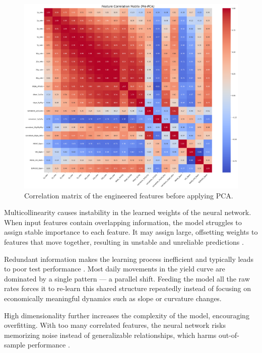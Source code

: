 {\begin{figure}[H]
	\centering
	\includegraphics[width=1\textwidth]{images/features/feature_correlation_matrixPre-PCA.png}
	\caption{Correlation matrix of the engineered features before applying PCA.}
	\label{fig:feature_correlation_prePCA}
\end{figure}

Multicollinearity causes instability in the learned weights of the neural network. When input features contain overlapping information, the model struggles to assign stable importance to each feature. It may assign large, offsetting weights to features that move together, resulting in unstable and unreliable predictions \parencite[p.~2]{chan2022multicollinearity}.

Redundant information makes the learning process inefficient and typically leads to poor test performance \parencite[p.~3]{sildir2020redudantfeatures}. Most daily movements in the yield curve are dominated by a single pattern — a parallel shift. Feeding the model all the raw rates forces it to re-learn this shared structure repeatedly instead of focusing on economically meaningful dynamics such as slope or curvature changes.

High dimensionality further increases the complexity of the model, encouraging overfitting. With too many correlated features, the neural network risks memorizing noise instead of generalizable relationships, which harms out-of-sample performance \parencite[p.~3]{sildir2020redudantfeatures}.

}
